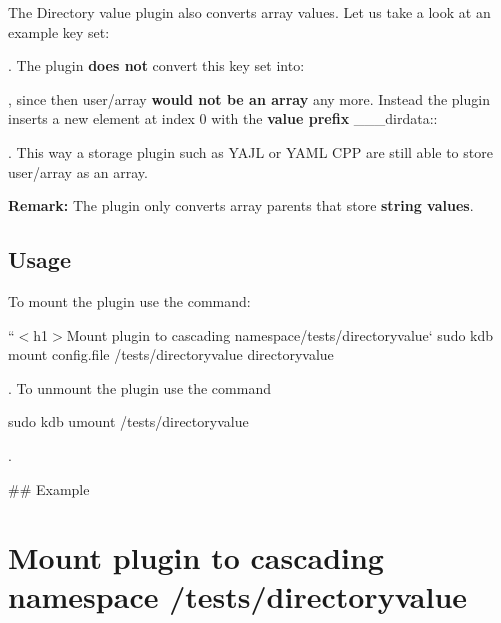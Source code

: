 The Directory value plugin also converts array values. Let us take a look at an example key set\+:




. The plugin {\bfseries does not} convert this key set into\+:




, since then {\ttfamily user/array} {\bfseries would not be an array} any more. Instead the plugin inserts a new element at index 0 with the {\bfseries value prefix} {\ttfamily \+\_\+\+\_\+\+\_\+dirdata\+:}\+:




. This way a storage plugin such as Y\+A\+JL or Y\+A\+ML C\+PP are still able to store {\ttfamily user/array} as an array.

{\bfseries Remark\+:} The plugin only converts array parents that store {\bfseries string values}.

\subsection*{Usage}

To mount the plugin use the command\+:

``{\ttfamily  $<$h1$>$Mount plugin to cascading namespace}/tests/directoryvalue` sudo kdb mount config.\+file /tests/directoryvalue directoryvalue 
\begin{DoxyCode}
. To unmount the plugin use the command
\end{DoxyCode}
 sudo kdb umount /tests/directoryvalue 
\begin{DoxyCode}
.

## Example
\end{DoxyCode}
 \section*{Mount plugin to cascading namespace {\ttfamily /tests/directoryvalue}}

